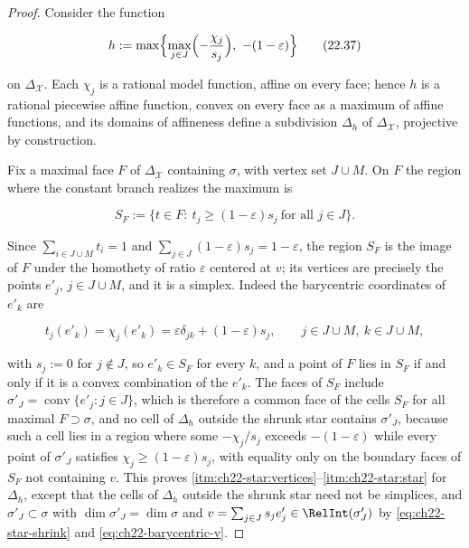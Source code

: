 \begin{proof}
Consider the function

\[
 h:=\max\Bigl\{\max_{j\in J}\Bigl(-\frac{\chi_j}{s_j}\Bigr),
       \ -(1-\varepsilon)\Bigr\}
\tag{22.37}\label{eq:ch22-support-function}
\]

on $\Delta_{\mathcal X}$.  Each $\chi_j$ is a rational model function,
affine on every face; hence $h$ is a rational piecewise affine function,
convex on every face as a maximum of affine functions, and its domains of
affineness define a subdivision $\Delta_h$ of
$\Delta_{\mathcal X}$, projective by construction.

Fix a maximal face $F$ of $\Delta_{\mathcal X}$ containing $\sigma$,
with vertex set $J\cup M$.  On $F$ the region where the constant branch
realizes the maximum is

\[
 S_F:=\{t\in F:\ t_j\geq(1-\varepsilon)s_j\ \text{for all }j\in J\}.
\]

Since $\sum_{i\in J\cup M}t_i=1$ and
$\sum_{j\in J}(1-\varepsilon)s_j=1-\varepsilon$, the region $S_F$ is the
image of $F$ under the homothety of ratio $\varepsilon$ centered at
$v$; its vertices are precisely the points $e'_j$, $j\in J\cup M$, and
it is a simplex.  Indeed the barycentric coordinates of $e'_k$ are

\[
              t_j(e'_k)=\chi_j(e'_k)
              =\varepsilon\delta_{jk}+(1-\varepsilon)s_j,
              \qquad j\in J\cup M,\ k\in J\cup M,
\tag{22.38}\label{eq:ch22-coordinate-values}
\]

with $s_j:=0$ for $j\notin J$, so $e'_k\in S_F$ for every $k$, and a
point of $F$ lies in $S_F$ if and only if it is a convex combination of
the $e'_k$.  The faces of $S_F$ include
$\sigma'_J=\operatorname{conv}\{e'_j:j\in J\}$, which is therefore a common
face of the cells $S_F$ for all maximal $F\supset\sigma$, and no cell of
$\Delta_h$ outside the shrunk star contains $\sigma'_J$, because such a
cell lies in a region where some $-\chi_j/s_j$ exceeds
$-(1-\varepsilon)$ while every point of $\sigma'_J$ satisfies
$\chi_j\geq(1-\varepsilon)s_j$, with equality only on the boundary faces of
$S_F$ not containing $v$.  This proves
\cref{itm:ch22-star:vertices}--\cref{itm:ch22-star:star} for $\Delta_h$,
except that the cells of $\Delta_h$ outside the shrunk star need not be
simplices, and $\sigma'_J\subset\sigma$ with
$\dim\sigma'_J=\dim\sigma$ and $v=\sum_{j\in J}s_je'_j\in
\RelInt(\sigma'_J)$ by \eqref{eq:ch22-star-shrink} and
\eqref{eq:ch22-barycentric-v}.


\end{proof}
